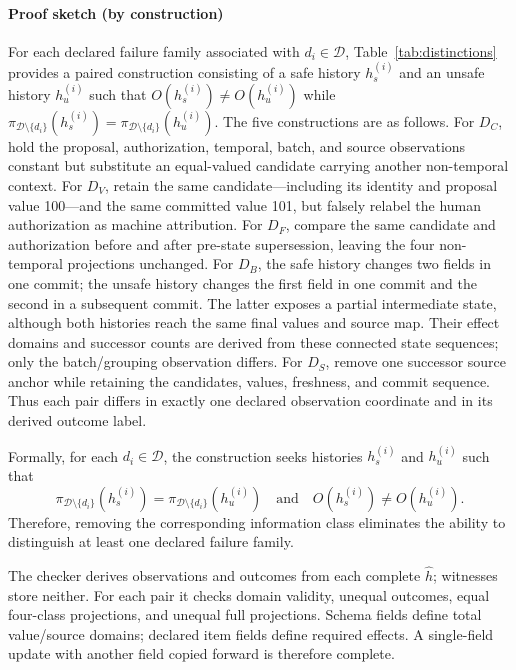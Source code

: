 \paragraph{Proof sketch (by construction)}
For each declared failure family associated with $d_i\in\mathcal D$, Table~\ref{tab:distinctions} provides a paired construction consisting of a safe history $h_s^{(i)}$ and an unsafe history $h_u^{(i)}$ such that
$O(h_s^{(i)})\neq O(h_u^{(i)})$ while
$\pi_{\mathcal D\setminus\{d_i\}}(h_s^{(i)})=\pi_{\mathcal D\setminus\{d_i\}}(h_u^{(i)})$.
The five constructions are as follows. For $D_C$, hold the proposal, authorization, temporal, batch, and source observations constant but substitute an equal-valued candidate carrying another non-temporal context. For $D_V$, retain the same candidate---including its identity and proposal value 100---and the same committed value 101, but falsely relabel the human authorization as machine attribution. For $D_F$, compare the same candidate and authorization before and after pre-state supersession, leaving the four non-temporal projections unchanged. For $D_B$, the safe history changes two fields in one commit; the unsafe history changes the first field in one commit and the second in a subsequent commit. The latter exposes a partial intermediate state, although both histories reach the same final values and source map. Their effect domains and successor counts are derived from these connected state sequences; only the batch/grouping observation differs. For $D_S$, remove one successor source anchor while retaining the candidates, values, freshness, and commit sequence. Thus each pair differs in exactly one declared observation coordinate and in its derived outcome label.

Formally, for each $d_i\in\mathcal D$, the construction seeks histories $h_s^{(i)}$ and $h_u^{(i)}$ such that
\begin{equation}
\pi_{\mathcal D\setminus\{d_i\}}(h_s^{(i)})
=
\pi_{\mathcal D\setminus\{d_i\}}(h_u^{(i)})
\quad\text{and}\quad
O(h_s^{(i)})\neq O(h_u^{(i)}).
\label{eq:irredundancy}
\end{equation}
Therefore, removing the corresponding information class eliminates the ability to distinguish at least one declared failure family.

The checker  derives observations and outcomes from each complete $\widehat h$; witnesses store neither. For each pair it checks domain validity, unequal outcomes, equal four-class projections, and unequal full projections. Schema fields define total value/source domains; declared item fields define required effects. A single-field update with another field copied forward is therefore complete.

